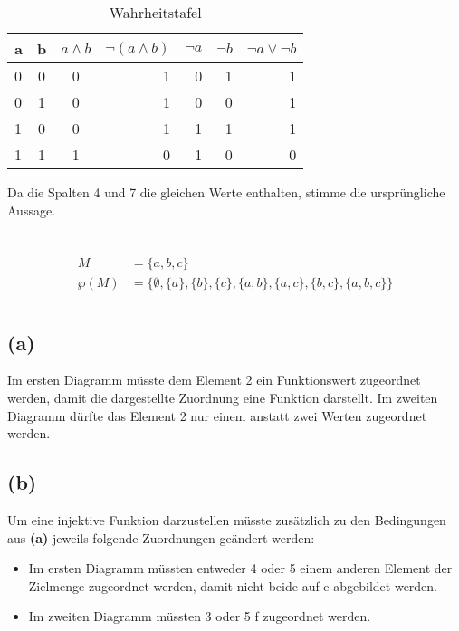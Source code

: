 \documentclass[11pt,a4paper]{article}
\begin{document}
\begin{table}[!th]
\begin{tabular}{|l|c|c|r|r|r|r|}
\hline
a & b & $a \wedge b$ & $\lnot(a \wedge b)$ & $\lnot a$ & $\lnot b$ & $\lnot a \vee \lnot b$ \\
\hline
0 & 0 & 0 & 1 & 0 & 1 & 1 \\
0 & 1 & 0 & 1 & 0 & 0 & 1 \\
1 & 0 & 0 & 1 & 1 & 1 & 1 \\
1 & 1 & 1 & 0 & 1 & 0 & 0 \\
\hline
\end{tabular}
\caption{Wahrheitstafel}
\label{ex:table}
\end{table}

Da die Spalten 4 und 7 die gleichen Werte enthalten, stimme die ursprüngliche Aussage.

\section{}

\begin{align}
M &= \{a,b,c\}\\
\wp(M) &= \{\emptyset, \{a\}, \{b\}, \{c\}, \{a,b\}, \{a,c\}, \{b,c\}, \{a,b,c\}\}
\end{align}

\section{}

\subsection{(a)}
Im ersten Diagramm müsste dem Element 2 ein Funktionswert zugeordnet werden, damit die dargestellte Zuordnung eine Funktion darstellt. Im zweiten Diagramm dürfte das Element 2 nur einem anstatt zwei Werten zugeordnet werden.

\subsection{(b)}
Um eine injektive Funktion darzustellen müsste zusätzlich zu den Bedingungen aus \textbf{(a)} jeweils folgende Zuordnungen geändert werden:
\begin{itemize}
\item Im ersten Diagramm müssten entweder 4 oder 5 einem anderen Element der Zielmenge zugeordnet werden, damit nicht beide auf e abgebildet werden.
\item Im zweiten Diagramm müssten 3 oder 5 f zugeordnet werden.
\end{itemize}
\end{document}
